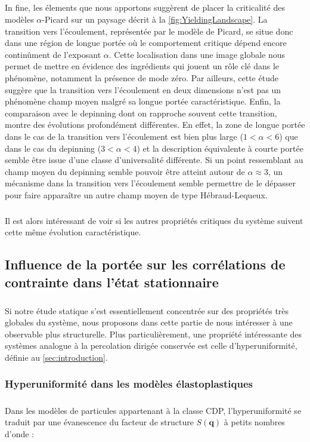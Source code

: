 \subparagraph{}In fine, les élements que nous apportons suggèrent de placer la criticalité des modèles $\alpha$-Picard sur un paysage décrit à la \autoref{fig:YieldingLandscape}. La transition vers l'écoulement, représentée par le modèle de Picard, se situe donc dans une région de longue portée où le comportement critique dépend encore continûment de l'exposant $\alpha$. Cette localisation dans une image globale nous permet de mettre en évidence des ingrédients qui jouent un rôle clé dans le phénomène, notamment la présence de mode zéro. Par ailleurs, cette étude suggère que la transition vers l'écoulement en deux dimensions n'est pas un phénomène champ moyen malgré sa longue portée caractéristique. Enfin, la comparaison avec le depinning dont on rapproche souvent cette transition, montre des évolutions profondément différentes. En effet, la zone de longue portée dans le cas de la transition vers l'écoulement est bien plus large ($1<\alpha<6$) que dans le cas du depinning ($3<\alpha<4$) et la description équivalente à courte portée semble être issue d'une classe d'universalité différente. Si un point ressemblant au champ moyen du depinning semble pouvoir être atteint autour de $\alpha\approx 3$, un mécanisme dans la transition vers l'écoulement semble permettre de le dépasser pour faire apparaître un autre champ moyen de type Hébraud-Lequeux.

\subparagraph{}Il est alors intéressant de voir si les autres propriétés critiques du système suivent cette même évolution caractéristique.

\subsection{Influence de la portée sur les corrélations de contrainte dans l'état stationnaire}

\subparagraph{}Si notre étude statique s'est essentiellement concentrée sur des propriétés très globales du système, nous proposons dans cette partie de nous intéresser à une observable plus structurelle. Plus particulièrement, une propriété intéressante des systèmes analogue à la percolation dirigée conservée est celle d'hyperuniformité, définie au \autoref{sec:introduction}.

\subsubsection{Hyperuniformité dans les modèles élastoplastiques}

\subparagraph{}Dans les modèles de particules appartenant à la classe CDP, l'hyperuniformité se traduit par une évanescence du facteur de structure $S(\mathbf{q})$ à petits nombres d'onde :

